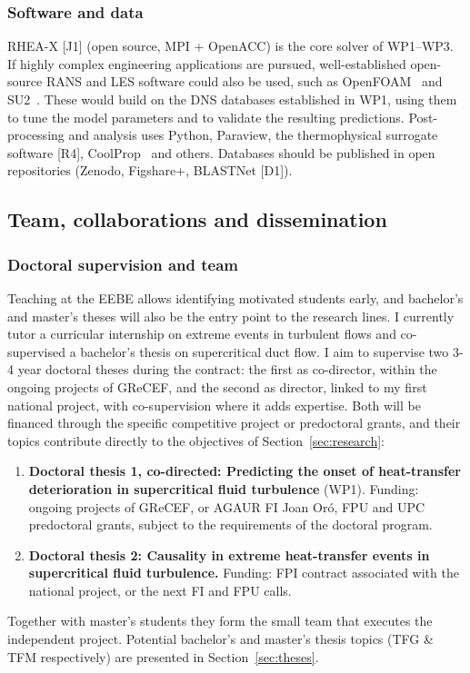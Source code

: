 \documentclass[11pt]{article}
\begin{document}
\subsubsection{Software and data} 
RHEA-X [J1] (open source, MPI + OpenACC) is the core solver of WP1--WP3. 
If highly complex engineering applications are pursued, well-established open-source RANS and LES software could also be used, such as OpenFOAM~\cite{Weller1998} and SU2~\cite{Economon2016}. %
These would build on the DNS databases established in WP1, using them to tune the model parameters and to validate the resulting predictions.
Post-processing and analysis uses Python, Paraview, the thermophysical surrogate software [R4],  CoolProp~\cite{CoolProp2014} and others. 
Databases should be published in open repositories (Zenodo, Figshare+, BLASTNet [D1]).


\subsection{Team, collaborations and dissemination}\label{sec:mobility}\label{sec:dissemination}

\subsubsection{Doctoral supervision and team}
Teaching at the EEBE allows identifying motivated students early, and bachelor's and master's theses will also be the entry point to the research lines. 
I currently tutor a curricular internship on extreme events in turbulent flows and co-supervised a bachelor's thesis on supercritical duct flow. 
I aim to supervise two 3-4 year doctoral theses during the contract: the first as co-director, within the ongoing projects of GReCEF, and the second as director, linked to my first national project, with co-supervision where it adds expertise. 
Both will be financed through the specific competitive project or predoctoral grants, and their topics contribute directly to the objectives of Section~\ref{sec:research}:
\begin{enumerate}
  \item \textbf{Doctoral thesis 1, co-directed: Predicting the onset of heat-transfer deterioration in supercritical fluid turbulence} (WP1). Funding: ongoing projects of GReCEF, or AGAUR FI Joan Or\'o, FPU and UPC predoctoral grants, subject to the requirements of the doctoral program.
  \item \textbf{Doctoral thesis 2: Causality in extreme heat-transfer events in supercritical fluid turbulence.} Funding: FPI contract associated with the national project, or the next FI and FPU calls.
\end{enumerate}
Together with master's students they form the small team that executes the independent project.
Potential bachelor's and master's thesis topics (TFG \& TFM respectively) are presented in Section~\ref{sec:theses}.
\end{document}
